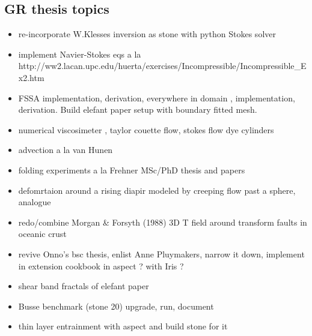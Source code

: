 \subsection{GR thesis topics}
\begin{itemize} 
\item re-incorporate W.Klesses inversion as stone with python Stokes solver
\item implement Navier-Stokes eqs a la http://ww2.lacan.upc.edu/huerta/exercises/Incompressible/Incompressible\_Ex2.htm
\item FSSA implementation, derivation, everywhere in domain \cite{sctc20}, implementation, derivation. Build elefant paper
      setup with boundary fitted mesh.
\item numerical viscosimeter \cite{batt84}, taylor couette flow, stokes flow dye cylinders
\item advection a la van Hunen
\item folding experiments a la Frehner MSc/PhD thesis and papers 
\item defomrtaion around a rising diapir modeled by creeping flow past a sphere, analogue \cite{crud88}
\item redo/combine Morgan \& Forsyth (1988) \cite{mofo88} 3D T field around transform faults in oceanic crust
\item revive Onno's bsc thesis, enlist Anne Pluymakers, narrow it down, implement in extension 
      cookbook in aspect ? with Iris ?
\item shear band fractals of elefant paper
\item Busse benchmark (stone 20) upgrade, run, document
\item thin layer entrainment with aspect and build stone for it 
\end{itemize}

